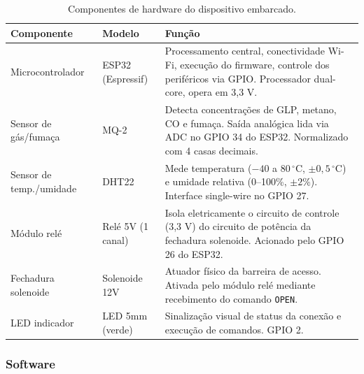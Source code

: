 \documentclass[12pt,a4paper]{article}
\begin{document}
\begin{table}[H]
  \centering
  \caption{Componentes de hardware do dispositivo embarcado.}
  \label{tab:hardware}
  \begin{tabular}{p{3.5cm} p{3.5cm} p{7cm}}
    \toprule
    \textbf{Componente} & \textbf{Modelo} & \textbf{Função} \\
    \midrule
    Microcontrolador & ESP32 (Espressif) &
      Processamento central, conectividade Wi-Fi, execução do firmware, controle dos
      periféricos via GPIO. Processador dual-core, opera em 3,3 V. \\[4pt]

    Sensor de gás/fumaça & MQ-2 &
      Detecta concentrações de GLP, metano, CO e fumaça. Saída analógica lida via
      ADC no GPIO 34 do ESP32. Normalizado com 4 casas decimais. \\[4pt]

    Sensor de temp./umidade & DHT22 &
      Mede temperatura ($-40$ a $80\,^\circ$C, $\pm0,5\,^\circ$C) e umidade relativa
      (0--100\%, $\pm2\%$). Interface single-wire no GPIO 27. \\[4pt]

    Módulo relé & Relé 5V (1 canal) &
      Isola eletricamente o circuito de controle (3,3 V) do circuito de potência da
      fechadura solenoide. Acionado pelo GPIO 26 do ESP32. \\[4pt]

    Fechadura solenoide & Solenoide 12V &
      Atuador físico da barreira de acesso. Ativada pelo módulo relé mediante
      recebimento do comando \texttt{OPEN}. \\[4pt]

    LED indicador & LED 5mm (verde) &
      Sinalização visual de status da conexão e execução de comandos. GPIO 2. \\
    \bottomrule
  \end{tabular}
  \par{}
\end{table}

\subsubsection{Software}
\end{document}
